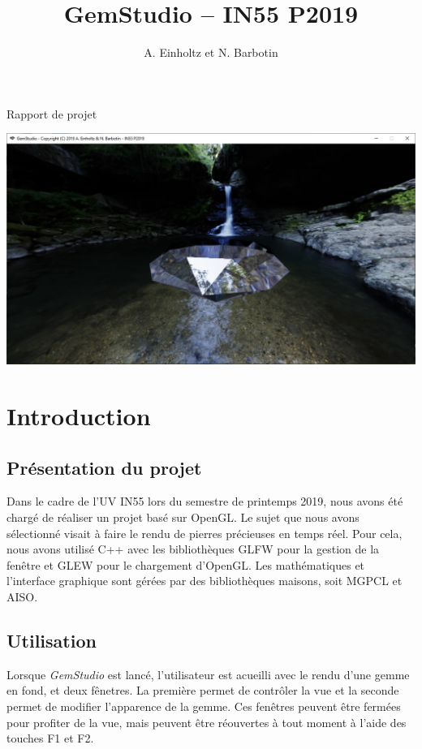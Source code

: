 \documentclass[a4paper,12pt]{article}
\title{GemStudio -- IN55 P2019}
\author{A. Einholtz et N. Barbotin}
\begin{document}
\setlength{\parindent}{0cm}
\setlength{\parskip}{8pt}

\begin{center}
    \Huge Rapport de projet\\
    \LARGE \thetitle

    \vfill
    \includegraphics[width=15cm]{screenshot.jpg}
    \vfill
\end{center}

\newpage
\tableofcontents

\newpage
\section{Introduction}
\subsection{Présentation du projet}
Dans le cadre de l'UV IN55 lors du semestre de printemps 2019, nous avons été chargé de réaliser
un projet basé sur OpenGL. Le sujet que nous avons sélectionné visait à faire le rendu de pierres
précieuses en temps réel. Pour cela, nous avons utilisé C++ avec les bibliothèques GLFW pour la
gestion de la fenêtre et GLEW pour le chargement d'OpenGL. Les mathématiques et l'interface graphique
sont gérées par des bibliothèques maisons, soit MGPCL et AISO.

\subsection{Utilisation}
Lorsque \emph{GemStudio} est lancé, l'utilisateur est acueilli avec le rendu d'une gemme en fond, et
deux fênetres. La première permet de contrôler la vue et la seconde permet de modifier l'apparence de
la gemme. Ces fenêtres peuvent être fermées pour profiter de la vue, mais peuvent être réouvertes à tout
moment à l'aide des touches F1 et F2.
\end{document}
